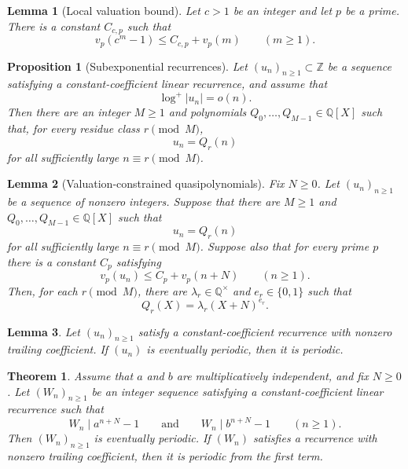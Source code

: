 \documentclass[10pt,a4paper]{amsart}
\newtheorem{theorem}{Theorem}
\newtheorem{lemma}{Lemma}
\newtheorem{proposition}{Proposition}
\newcommand{\Q}{\mathbb Q}
\newcommand{\Z}{\mathbb Z}
\begin{document}
\begin{lemma}[Local valuation bound]\label{lem:valuation-bound}
Let $c>1$ be an integer and let $p$ be a prime.  There is a constant
$C_{c,p}$ such that
\[
  v_p(c^m-1)\le C_{c,p}+v_p(m)
  \qquad(m\ge 1).
\]
\end{lemma}

\begin{proposition}[Subexponential recurrences]\label{prop:quasipolynomial}
Let $(u_n)_{n\ge 1}\subset\Z$ be a sequence satisfying a constant-coefficient
linear recurrence, and assume that
\[
  \log^+|u_n|=o(n).
\]
Then there are an integer $M\ge 1$ and polynomials
$Q_0,\dots,Q_{M-1}\in\Q[X]$ such that, for every residue class
$r\pmod M$,
\[
  u_n=Q_r(n)
\]
for all sufficiently large $n\equiv r\pmod M$.
\end{proposition}

\begin{lemma}[Valuation-constrained quasipolynomials]\label{lem:local-polynomial}
Fix $N\ge 0$.  Let $(u_n)_{n\ge 1}$ be a sequence of nonzero integers.  Suppose
that there are $M\ge 1$ and $Q_0,\dots,Q_{M-1}\in\Q[X]$ such that
\[
  u_n=Q_r(n)
\]
for all sufficiently large $n\equiv r\pmod M$.  Suppose also that for every
prime $p$ there is a constant $C_p$ satisfying
\begin{equation}\label{eq:valuation-hypothesis}
  v_p(u_n)\le C_p+v_p(n+N)
  \qquad(n\ge 1).
\end{equation}
Then, for each $r\pmod M$, there are $\lambda_r\in\Q^\times$ and
$e_r\in\{0,1\}$ such that
\[
  Q_r(X)=\lambda_r(X+N)^{e_r}.
\]
\end{lemma}

\begin{lemma}\label{lem:eventual-periodic}
Let $(u_n)_{n\ge 1}$ satisfy a constant-coefficient recurrence with nonzero trailing
coefficient.  If $(u_n)$ is eventually periodic, then it is periodic.
\end{lemma}

\begin{theorem}\label{thm:common-factor}
Assume that $a$ and $b$ are multiplicatively independent, and fix $N\ge 0$.
Let $(W_n)_{n\ge 1}$ be an integer sequence satisfying a constant-coefficient
linear recurrence such that
\begin{equation}\label{eq:common-factor-hypothesis}
  W_n\mid a^{n+N}-1
  \qquad\text{and}\qquad
  W_n\mid b^{n+N}-1
  \qquad(n\ge 1).
\end{equation}
Then $(W_n)_{n\ge 1}$ is eventually periodic.  If $(W_n)$ satisfies a recurrence
with nonzero trailing coefficient, then it is periodic from the first term.
\end{theorem}
\end{document}
